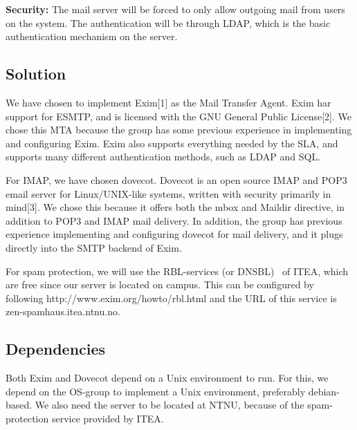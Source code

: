 \documentclass[12pt]{article}
\begin{document}
\textbf{Security:}
The mail server will be forced to only allow outgoing mail from users on
the system. The authentication will be through LDAP, which is the basic
authentication mechanism on the server.

\subsection{Solution}

We have chosen to implement Exim[1] as the Mail Transfer Agent. Exim har
support for ESMTP, and is licensed with the GNU General Public
License[2]. We chose this MTA because the group has some previous
experience in implementing and configuring Exim. Exim also supports
everything needed by the SLA, and supports many different authentication
methods, such as LDAP and SQL. 

For IMAP, we have chosen dovecot. Dovecot is an open source IMAP and
POP3 email server for Linux/UNIX-like systems, written with security
primarily in mind[3]. We chose this because it offers both the mbox and
Maildir directive, in addition to POP3 and IMAP mail delivery. In
addition, the group has previous experience implementing and configuring
dovecot for mail delivery, and it plugs directly into the SMTP backend
of Exim.

For spam protection, we will use the RBL-services (or DNSBL)  of ITEA,
which are free since our server is located on campus. This can be
configured by following http://www.exim.org/howto/rbl.html and the URL
of this service is zen-spamhaus.itea.ntnu.no.

\subsection{Dependencies}
Both Exim and Dovecot depend on a Unix environment to run. For this, we
depend on the OS-group to implement a Unix environment, preferably
debian-based.
We also need the server to be located at NTNU, because of the
spam-protection service provided by ITEA. 

\newpage
\end{document}
